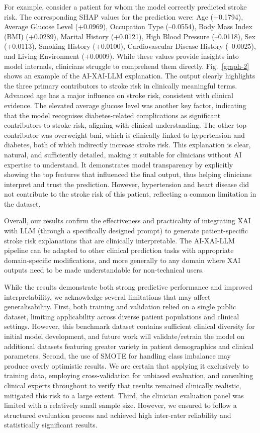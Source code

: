 \medskip
For example, consider a patient for whom the model correctly predicted stroke risk. The corresponding SHAP values for the prediction were: Age (+0.1794), Average Glucose Level (+0.0969), Occupation Type (–0.0554), Body Mass Index (BMI) (+0.0289), Marital History (+0.0121), High Blood Pressure (–0.0118), Sex (+0.0113), Smoking History (+0.0100), Cardiovascular Disease History (–0.0025), and Living Environment (+0.0009). While these values provide insights into model internals, clinicians struggle to comprehend them directly. Fig.~\ref{graph-2} shows an example of the AI-XAI-LLM explanation. The output clearly highlights the three primary contributors to stroke risk in clinically meaningful terms. Advanced age has a major influence on stroke risk, consistent with clinical evidence. The elevated average glucose level was another key factor, indicating that the model recognises diabetes-related complications as significant contributors to stroke risk, aligning with clinical understanding. The other top contributor was overweight bmi, which is clinically linked to hypertension and diabetes, both of which indirectly increase stroke risk. This explanation is clear, natural, and sufficiently detailed, making it suitable for clinicians without AI expertise to understand. It demonstrates model transparency by explicitly showing the top features that influenced the final output, thus helping clinicians interpret and trust the prediction. However, hypertension and heart disease did not contribute to the stroke risk of this patient, reflecting a common limitation in the dataset.

\medskip
Overall, our results confirm the effectiveness and practicality of integrating XAI with LLM (through a specifically designed prompt) to generate patient-specific stroke risk explanations that are clinically interpretable. The AI-XAI-LLM pipeline can be adapted to other clinical prediction tasks with appropriate domain-specific modifications, and more generally to any domain where XAI outputs need to be made understandable for non-technical users.

\medskip
While the results demonstrate both strong predictive performance and improved interpretability, we acknowledge several limitations that may affect generalisability. First, both training and validation relied on a single public dataset, limiting applicability across diverse patient populations and clinical settings. However, this benchmark dataset contains sufficient clinical diversity for initial model development, and future work will validate/retrain the model on additional datasets featuring greater variety in patient demographics and clinical parameters. Second, the use of SMOTE for handling class imbalance may produce overly optimistic results. We are certain that applying it exclusively to training data, employing cross-validation for unbiased evaluation, and consulting clinical experts throughout to verify that results remained clinically realistic, mitigated this risk to a large extent. Third, the clinician evaluation panel was limited with a relatively small sample size. However, we ensured to follow a structured evaluation process and achieved high inter-rater reliability and statistically significant results.

